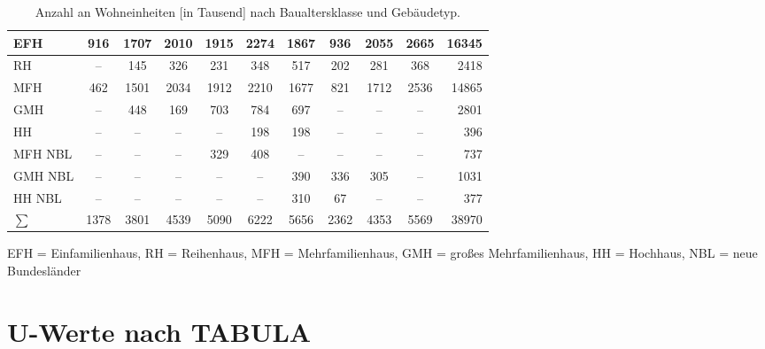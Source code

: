 \begin{table}[H]
\begin{tabular}{|l|c|c|c|c|c|c|c|c|c|r|}
EFH & 916 & 1707 & 2010 & 1915 & 2274 & 1867 & 936 & 2055 & 2665 & 16345 \\ \hline
\rowcolor[HTML]{EFEFEF} 
RH & -- & 145 & 326 & 231 & 348 & 517 & 202 & 281 & 368 & 2418 \\ \hline
MFH & 462 & 1501 & 2034 & 1912 & 2210 & 1677 & 821 & 1712 & 2536 & 14865 \\ \hline
\rowcolor[HTML]{EFEFEF} 
GMH & -- & 448 & 169 & 703 & 784 & 697 & -- & -- & -- & 2801 \\ \hline
HH & -- & -- & -- & -- & 198 & 198 & -- & -- & -- & 396 \\ \hline
\rowcolor[HTML]{EFEFEF} 
MFH NBL & -- & -- & -- & 329 & 408 & -- & -- & -- & -- & 737 \\ \hline
GMH NBL & -- & -- & -- & -- & -- & 390 & 336 & 305 & -- & 1031 \\ \hline
\rowcolor[HTML]{EFEFEF} 
HH NBL & -- & -- & -- & -- & -- & 310 & 67 & -- & -- & 377 \\ \hline
\(\sum\) & 1378 & 3801 & 4539 & 5090 & 6222 & 5656 & 2362 & 4353 & 5569 & 38970 \\ \hline
\end{tabular}
\caption{Anzahl an Wohneinheiten [in Tausend] nach Baualtersklasse und Gebäudetyp. \cite{Diefenbach.12.11.2007}}
\label{tab: TabelleA0}
\end{table}
EFH = Einfamilienhaus, RH = Reihenhaus, MFH = Mehrfamilienhaus, GMH = großes Mehrfamilienhaus, HH = Hochhaus, NBL = neue Bundesländer

\section{U-Werte nach TABULA}

